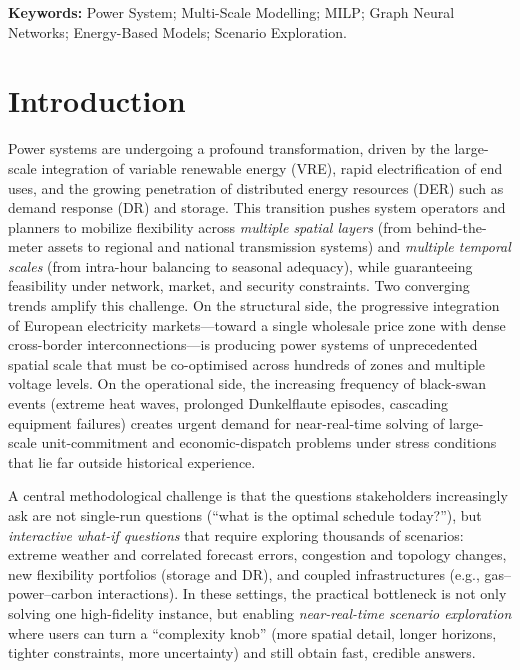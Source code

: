 \documentclass{article}
\begin{document}
\noindent\textbf{Keywords:} Power System; Multi-Scale Modelling; MILP; Graph Neural Networks; Energy-Based Models; Scenario Exploration.

\section{Introduction}

Power systems are undergoing a profound transformation, driven by the large-scale integration of variable renewable energy (VRE), rapid electrification of end uses, and the growing penetration of distributed energy resources (DER) such as demand response (DR) and storage. This transition pushes system operators and planners to mobilize flexibility across \emph{multiple spatial layers} (from behind-the-meter assets to regional and national transmission systems) and \emph{multiple temporal scales} (from intra-hour balancing to seasonal adequacy), while guaranteeing feasibility under network, market, and security constraints. Two converging trends amplify this challenge. On the structural side, the progressive integration of European electricity markets---toward a single wholesale price zone with dense cross-border interconnections---is producing power systems of unprecedented spatial scale that must be co-optimised across hundreds of zones and multiple voltage levels. On the operational side, the increasing frequency of black-swan events (extreme heat waves, prolonged Dunkelflaute episodes, cascading equipment failures) creates urgent demand for near-real-time solving of large-scale unit-commitment and economic-dispatch problems under stress conditions that lie far outside historical experience.

A central methodological challenge is that the questions stakeholders increasingly ask are not single-run questions (``what is the optimal schedule today?''), but \emph{interactive what-if questions} that require exploring thousands of scenarios: extreme weather and correlated forecast errors, congestion and topology changes, new flexibility portfolios (storage and DR), and coupled infrastructures (e.g., gas--power--carbon interactions). In these settings, the practical bottleneck is not only solving one high-fidelity instance, but enabling \emph{near-real-time scenario exploration} where users can turn a ``complexity knob'' (more spatial detail, longer horizons, tighter constraints, more uncertainty) and still obtain fast, credible answers.
\end{document}
